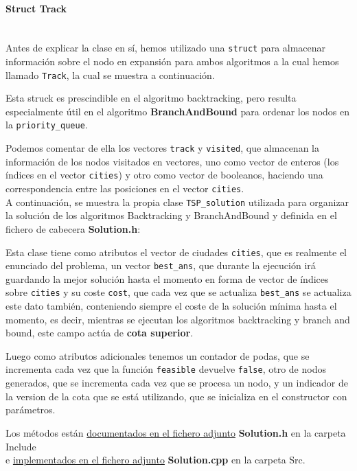 \documentclass{article}
\newcommand{\myparagraph}[1]{\paragraph{#1}\mbox{}\\}
\begin{document}
\myparagraph{Struct Track}
Antes de explicar la clase en sí, hemos utilizado una \verb|struct| para almacenar información sobre el nodo en expansión para ambos algoritmos a la cual hemos llamado \verb|Track|, la cual se muestra a continuación.



Esta struck es prescindible en el algoritmo backtracking, pero resulta especialmente útil en el algoritmo \textbf{BranchAndBound} para ordenar los nodos en la \verb|priority_queue|.

Podemos comentar de ella los vectores \verb|track| y \verb|visited|, que almacenan la información de los nodos visitados en vectores, uno como vector de enteros (los índices en el vector \verb|cities|) y otro como vector de booleanos, haciendo una correspondencia entre las posiciones en el vector \verb|cities|. \\

A continuación, se muestra la propia clase \verb|TSP_solution| utilizada para organizar la solución de los algoritmos Backtracking y BranchAndBound y definida en el fichero de cabecera \textbf{Solution.h}:



Esta clase tiene como atributos el vector de ciudades \verb|cities|, que es realmente el enunciado del problema, un vector \verb|best_ans|, que durante la ejecución irá guardando la mejor solución hasta el momento en forma de vector de índices sobre \verb|cities| y su coste \verb|cost|, que cada vez que se actualiza \verb|best_ans| se actualiza este dato también, conteniendo siempre el coste de la solución mínima hasta el momento, es decir, mientras se ejecutan 
los algoritmos backtracking y branch and bound, este campo actúa de \textbf{cota superior}.

Luego como atributos adicionales tenemos un contador de podas, que se incrementa cada vez que la función \verb|feasible| devuelve \verb|false|, otro de nodos generados, que se incrementa cada vez que se procesa un nodo, y un indicador de la version de la cota que se está utilizando, que se inicializa en el constructor con parámetros.

Los métodos están \underline{documentados en el fichero adjunto} \textbf{Solution.h} en la carpeta Include \\
e \underline{implementados en el fichero adjunto} \textbf{Solution.cpp} en la carpeta Src. \\
\end{document}
